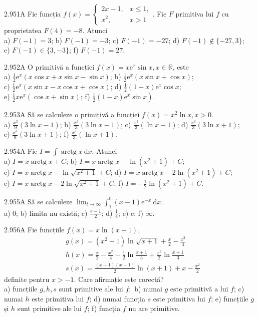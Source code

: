\documentclass[11pt]{article}
\begin{document}
2.951A Fie funcția $f(x)=\left\{\begin{array}{ll}2 x-1, & x \leq 1, \\ x^{2}, & x>1\end{array}\right.$. Fie $F$ primitiva lui $f$ cu proprietatea $F(4)=-8$. Atunci\\ a) $F(-1)=3$; b) $F(-1)=-3$; c) $F(-1)=-27$; d) $F(-1) \notin\{-27,3\}$;\\ e) $F(-1) \in\{3,-3\}$; f) $F(-1)=27$.

2.952A O primitivă a funcției $f(x)=x \mathrm{e}^{x} \sin x, x \in \mathbb{R}$, este\\ a) $\frac{1}{2} \mathrm{e}^{x}(x \cos x+x \sin x-\sin x)$; b) $\frac{1}{2} \mathrm{e}^{x}(x \sin x+\cos x)$;\\ c) $\frac{1}{2} \mathrm{e}^{x}(x \sin x-x \cos x+\cos x)$; d) $\frac{1}{2}(1-x) \mathrm{e}^{x} \cos x$;\\ e) $\frac{1}{2} x \mathrm{e}^{x}(\cos x+\sin x)$; f) $\left.\frac{1}{2}(1-x) \mathrm{e}^{x} \sin x\right)$.

2.953A Să se calculeze o primitivă a funcției $f(x)=x^{2} \ln x, x>0$.\\ a) $\frac{x^{3}}{9}(3 \ln x-1)$; b) $\frac{x^{3}}{3}(3 \ln x-1)$; c) $\frac{x^{3}}{3}(\ln x-1)$; d) $\frac{x^{3}}{3}(3 \ln x+1)$;\\ e) $\frac{x^{3}}{9}(3 \ln x+1)$; f) $\frac{x^{3}}{3}(\ln x+1)$.

2.954A Fie $I=\int \operatorname{arctg} x \mathrm{~d} x$. Atunci\\ a) $I=x \operatorname{arctg} x+C$; b) $I=x \operatorname{arctg} x-\ln \left(x^{2}+1\right)+C$;\\ c) $I=x \operatorname{arctg} x-\ln \sqrt{x^{2}+1}+C$; d) $I=x \operatorname{arctg} x-2 \ln \left(x^{2}+1\right)+C$;\\ e) $I=x \operatorname{arctg} x-2 \ln \sqrt{x^{2}+1}+C$; f) $I=-\frac{1}{2} \ln \left(x^{2}+1\right)+C$.

2.955A Să se calculeze $\lim _{t \rightarrow \infty} \int_{1}^{t}(x-1) \mathrm{e}^{-x} \mathrm{~d} x$.\\ a) $0$; b) limita nu există; c) $\frac{e-1}{2}$; d) $\frac{1}{\mathrm{e}}$; e) $\mathrm{e}$; f) $\infty$.

2.956A Fie funcțiile $f(x)=x \ln (x+1)$, $$\begin{aligned}& g(x)=\left(x^{2}-1\right) \ln \sqrt{x+1}+\frac{x}{2}-\frac{x^{2}}{4} \\& h(x)=\frac{x}{2}-\frac{x^{2}}{4}-\frac{1}{2} \ln \frac{x+1}{5}+\frac{x^{2}}{2} \ln \frac{x+1}{3} \\& s(x)=\frac{(x-1)(x+1)}{2} \ln (x+1)+x-\frac{x^{2}}{2}\end{aligned}$$ definite pentru $x>-1$. Care afirmație este corectă?\\ a) funcțiile $g, h, s$ sunt primitive ale lui $f ;$ b) numai $g$ este primitivă a lui $f$; c) numai $h$ este primitiva lui $f$; d) numai funcția $s$ este primitiva lui $f$; e) funcțiile $g$ și $h$ sunt primitive ale lui $f$; f) funcția $f$ nu are primitive.
\end{document}
